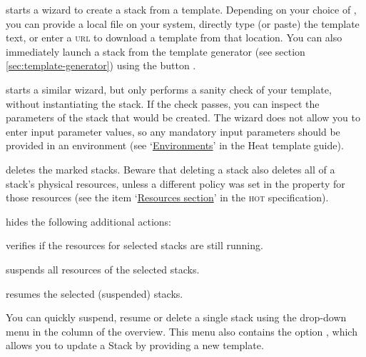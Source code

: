\begin{description}
\item{} starts a wizard to create a stack from a
  template.  Depending on your choice of , you
  can provide a local file on your system, directly type (or paste)
  the template text, or enter a \textsc{url} to download a template
  from that location.  You can also immediately launch a stack from
  the template generator (see section \ref{sec:template-generator})
  using the button .
\item{} starts a similar wizard, but only
  performs a sanity check of your template, without instantiating the
  stack.  If the check passes, you can inspect the parameters of the
  stack that would be created.  The wizard does not allow you to enter
  input parameter values, so any mandatory input parameters should be
  provided in an environment (see
  `\href{https://docs.openstack.org/heat/\osversion/template_guide/environment.html}{Environments}'
  in the Heat template guide).
\item{} deletes the marked stacks.  Beware that
  deleting a stack also deletes all of a stack's physical resources,
  unless a different policy was set in the
   property for those resources
  (see the item
  `\href{https://docs.openstack.org/heat/\osversion/template_guide/hot_spec.html#resources-section}{Resources
    section}' in the \textsc{hot} specification).
\item{} hides the following additional actions:
  \begin{description}
  \item{} verifies if the resources for selected
    stacks are still running.
  \item{} suspends all resources of the
    selected stacks.
  \item{} resumes the selected (suspended) stacks.
  \end{description}
\end{description}
You can quickly suspend, resume or delete a single stack using the
drop-down menu in the  column of the overview.  This
menu also contains the option , which
allows you to update a Stack by providing a new template.

